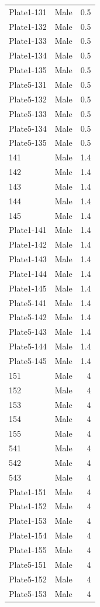 \begin{longtable}{l l r}
Plate1-131 & Male & 0.5 \\
Plate1-132 & Male & 0.5 \\
Plate1-133 & Male & 0.5 \\
Plate1-134 & Male & 0.5 \\
Plate1-135 & Male & 0.5 \\
Plate5-131 & Male & 0.5 \\
Plate5-132 & Male & 0.5 \\
Plate5-133 & Male & 0.5 \\
Plate5-134 & Male & 0.5 \\
Plate5-135 & Male & 0.5 \\
141 & Male & 1.4 \\
142 & Male & 1.4 \\
143 & Male & 1.4 \\
144 & Male & 1.4 \\
145 & Male & 1.4 \\
Plate1-141 & Male & 1.4 \\
Plate1-142 & Male & 1.4 \\
Plate1-143 & Male & 1.4 \\
Plate1-144 & Male & 1.4 \\
Plate1-145 & Male & 1.4 \\
Plate5-141 & Male & 1.4 \\
Plate5-142 & Male & 1.4 \\
Plate5-143 & Male & 1.4 \\
Plate5-144 & Male & 1.4 \\
Plate5-145 & Male & 1.4 \\
151 & Male & 4 \\
152 & Male & 4 \\
153 & Male & 4 \\
154 & Male & 4 \\
155 & Male & 4 \\
541 & Male & 4 \\
542 & Male & 4 \\
543 & Male & 4 \\
Plate1-151 & Male & 4 \\
Plate1-152 & Male & 4 \\
Plate1-153 & Male & 4 \\
Plate1-154 & Male & 4 \\
Plate1-155 & Male & 4 \\
Plate5-151 & Male & 4 \\
Plate5-152 & Male & 4 \\
Plate5-153 & Male & 4 \\

\end{longtable}
